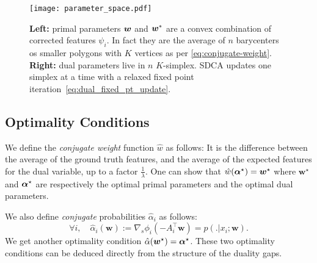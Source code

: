 \begin{figure}[t]
	\centering 
	\texttt{[image: parameter\_space.pdf]}
	\caption[
		Illustration of SDCA
	]{
		\textbf{Left:} primal parameters  $\boldsymbol{w}$ and $\boldsymbol{w}^*$ are a convex combination of corrected features $\psi_i$. In fact they are the average of $n$  barycenters os smaller polygons with $K$ vertices as per \eqref{eq:conjugate-weight}.
		\textbf{Right:} dual parameters live in $n$ $K$-simplex. SDCA updates one simplex at a time with a relaxed fixed point iteration~\eqref{eq:dual_fixed_pt_update}.
	}
	\label{fig:sdca}
\end{figure}

\subsection{Optimality Conditions}
We define the \emph{conjugate weight} function $\hat{w}$ as follows:
It is the difference between the average of the ground truth features, and the average of the expected features for the dual variable, up to a factor $\frac{1}{\lambda}$.
One can show that $\hat{w}(\boldsymbol{\alpha}^{\star}) = \bm w^{\star}$ where $\bm w^{\star}$ and $\boldsymbol{\alpha}^{\star}$ are respectively the optimal primal parameters and the optimal dual parameters.

We  also  define  \emph{conjugate} probabilities $\hat{\alpha}_i$ as follows:
\begin{equation}
	\forall i, \quad \hat{\alpha}_i(\bm w) := \nabla_s\phi_i(-A_i^{\top} \bm w) = p(.|x_i; \bm w).
	\label{primal to dual}
\end{equation}
We get another optimality condition $\hat{\alpha}(\bm w^{\star}) = \boldsymbol{\alpha}^{\star}$.
These two optimality conditions can be deduced directly from the structure of the duality gaps.

